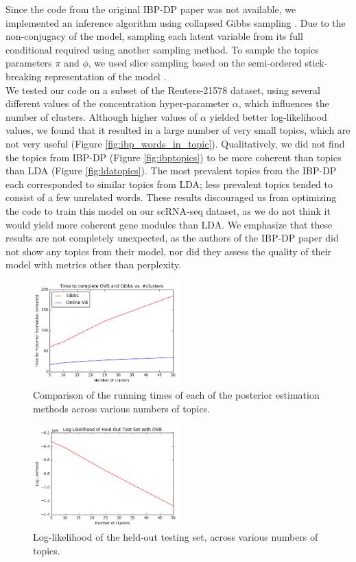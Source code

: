 \documentclass{article}
\begin{document}
Since the code from the original IBP-DP paper was not available, we implemented an inference algorithm using collapsed Gibbs sampling \cite{IBP}. Due to the non-conjugacy of the model, sampling each latent variable from its full conditional required using another sampling method. To sample the topics parameters $\pi$ and $\phi$, we used slice sampling based on the semi-ordered stick-breaking representation of the model \cite{IBP2}.\\

We tested our code on a subset of the Reuters-21578 dataset, using several different values of the concentration hyper-parameter $\alpha$, which influences the number of clusters. Although higher values of $\alpha$ yielded better log-likelihood values, we found that it resulted in a large number of very small topics, which are not very useful (Figure \ref{fig:ibp_words_in_topic}). Qualitatively, we did not find the topics from IBP-DP (Figure \ref{fig:ibptopics}) to be more coherent than topics than LDA (Figure \ref{fig:ldatopics}). The most prevalent topics from the IBP-DP each corresponded to similar topics from LDA; less prevalent topics tended to consist of a few unrelated words. These results discouraged us from optimizing the code to train this model on our scRNA-seq dataset, as we do not think it would yield more coherent gene modules than LDA. We emphasize that these results are not completely unexpected, as the authors of the IBP-DP paper did not show any topics from their model, nor did they assess the quality of their model with metrics other than perplexity.

\begin{figure}
    \centering
    \includegraphics[width=0.5\textwidth]{figs/time}
    \caption{Comparison of the running times of each of the posterior estimation methods across various numbers of topics.}
    \label{fig:time}
\end{figure}

\begin{figure}
    \centering
    \includegraphics[width=0.5\textwidth]{figs/ll}
    \caption{Log-likelihood of the held-out testing set, across various numbers of topics.}
    \label{fig:ll}
\end{figure}
\end{document}
